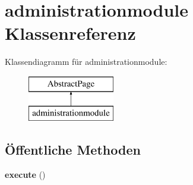 \hypertarget{classadministrationmodule}{}\section{administrationmodule Klassenreferenz}
\label{classadministrationmodule}
Klassendiagramm für administrationmodule\+:\begin{figure}[H]
\begin{center}
\leavevmode
\includegraphics[height=2.000000cm]{classadministrationmodule}
\end{center}
\end{figure}
\subsection*{Öffentliche Methoden}
\begin{DoxyCompactItemize}
\item 
\mbox{\label{classadministrationmodule_a13f088272a5a72363e7100c7f0084286}} 
{\bfseries execute} ()
\end{DoxyCompactItemize}
